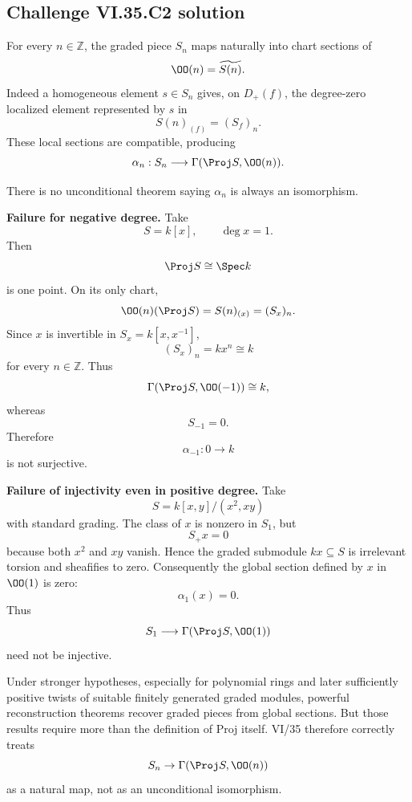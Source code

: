 \subsection*{Challenge VI.35.C2 solution}
\begin{solution}
For every \(n\in\mathbb Z\), the graded piece \(S_n\) maps naturally into chart sections of
\[
\OO(n)=\widetilde{S(n)}.
\]
Indeed a homogeneous element \(s\in S_n\) gives, on \(D_+(f)\), the degree-zero localized element represented by
\(s\) in
\[
S(n)_{(f)}=(S_f)_n.
\]
These local sections are compatible, producing
\[
\alpha_n:S_n\longrightarrow\Gamma(\Proj S,\OO(n)).
\]

There is no unconditional theorem saying \(\alpha_n\) is always an isomorphism.

\textbf{Failure for negative degree.}
Take
\[
S=k[x],
\qquad
\deg x=1.
\]
Then
\[
\Proj S\cong\Spec k
\]
is one point.  On its only chart,
\[
\OO(n)(\Proj S)
=
S(n)_{(x)}
=
(S_x)_n.
\]
Since \(x\) is invertible in \(S_x=k[x,x^{-1}]\),
\[
(S_x)_n=kx^n
\cong k
\]
for every \(n\in\mathbb Z\).  Thus
\[
\Gamma(\Proj S,\OO(-1))\cong k,
\]
whereas
\[
S_{-1}=0.
\]
Therefore
\[
\alpha_{-1}:0\to k
\]
is not surjective.

\textbf{Failure of injectivity even in positive degree.}
Take
\[
S=k[x,y]/(x^2,xy)
\]
with standard grading.  The class of \(x\) is nonzero in \(S_1\), but
\[
S_+x=0
\]
because both \(x^2\) and \(xy\) vanish.  Hence the graded submodule \(kx\subseteq S\) is irrelevant torsion and
sheafifies to zero.  Consequently the global section defined by \(x\) in \(\OO(1)\) is zero:
\[
\alpha_1(x)=0.
\]
Thus
\[
S_1\longrightarrow\Gamma(\Proj S,\OO(1))
\]
need not be injective.

Under stronger hypotheses, especially for polynomial rings and later sufficiently positive twists of suitable
finitely generated graded modules, powerful reconstruction theorems recover graded pieces from global sections.
But those results require more than the definition of Proj itself.  VI/35 therefore correctly treats
\[
S_n\to\Gamma(\Proj S,\OO(n))
\]
as a natural map, not as an unconditional isomorphism.
\end{solution}

